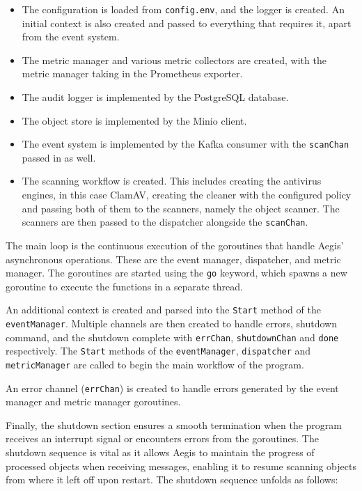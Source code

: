 \documentclass[12pt, conference, final, a4paper, onecolumn, compsoc]{IEEEtran}
\begin{document}
\medskip
\begin{itemize}
  \item The configuration is loaded from \texttt{config.env}, and the logger is
        created. An initial context is also created and passed to everything
        that requires it, apart from the event system.
  \item The metric manager and various metric collectors are created, with the
        metric manager taking in the Prometheus exporter.
  \item The audit logger is implemented by the PostgreSQL database.
  \item The object store is implemented by the Minio client.
  \item The event system is implemented by the Kafka consumer with the
        \texttt{scanChan} passed in as well.
  \item The scanning workflow is created. This includes creating the antivirus
        engines, in this case ClamAV, creating the cleaner with the configured
        policy and passing both of them to the scanners, namely the object
        scanner. The scanners are then passed to the dispatcher alongside the
        \texttt{scanChan}.
\end{itemize}
\bigskip



The main loop is the continuous execution of the goroutines that handle Aegis'
asynchronous operations. These are the event manager, dispatcher, and metric
manager. The goroutines are started using the \texttt{go} keyword, which spawns
a new goroutine to execute the functions in a separate thread.

An additional context is created and parsed into the \texttt{Start} method of
the \texttt{eventManager}. Multiple channels are then created to handle errors,
shutdown command, and the shutdown complete with \texttt{errChan},
\texttt{shutdownChan} and \texttt{done} respectively. The \texttt{Start} methods
of the \texttt{eventManager}, \texttt{dispatcher} and \texttt{metricManager} are
called to begin the main workflow of the program.

An error channel (\texttt{errChan}) is created to handle errors generated by the
event manager and metric manager goroutines.



Finally, the shutdown section ensures a smooth termination when the program
receives an interrupt signal or encounters errors from the goroutines. The
shutdown sequence is vital as it allows Aegis to maintain the progress of
processed objects when receiving messages, enabling it to resume scanning
objects from where it left off upon restart. The shutdown sequence unfolds as
follows:
\end{document}
